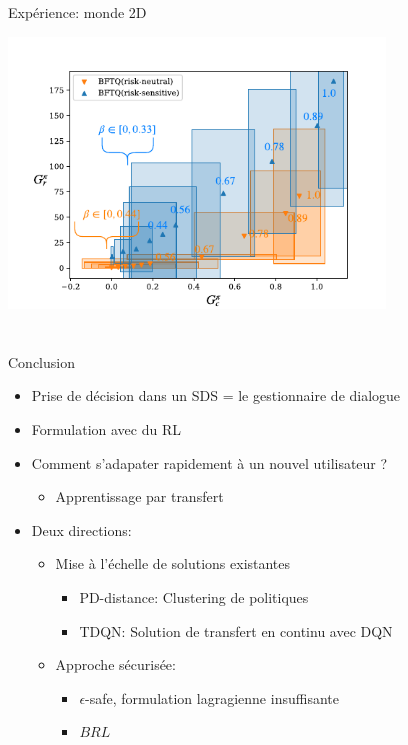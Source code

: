 \documentclass[french,handout]{beamer}
\begin{document}
    \begin{frame}{Expérience: monde 2D}
        \begin{center}
            \includegraphics[page=1, width=0.75\textwidth]{img/corridors}
        \end{center}
    \end{frame}

    \section{}
    \subsection{}
    \begin{frame}{Conclusion}
        \begin{itemize}
            \item Prise de décision dans un SDS = le gestionnaire de dialogue
            \item Formulation avec du RL
            \item Comment s'adapater rapidement à un nouvel utilisateur ?
            \begin{itemize}
                \item Apprentissage par transfert
            \end{itemize}
            \item Deux directions:
            \begin{itemize}
                \item Mise à l'échelle de solutions existantes
                \begin{itemize}
                    \item PD-distance: Clustering de politiques
                    \item TDQN: Solution de transfert en continu avec DQN
                \end{itemize}
                \item Approche sécurisée:
                \begin{itemize}
                    \item $\epsilon$-safe, formulation lagragienne insuffisante
                    \item $BRL$
                \end{itemize}
            \end{itemize}
        \end{itemize}
    \end{frame}


\end{document}
